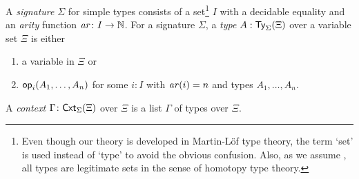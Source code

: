 \begin{definition} \label{def:simple-signature}
  A \emph{signature} $\Sigma$ for simple types consists of a set\footnote{%
    Even though our theory is developed in Martin-L\"of type theory, the term `set' is used instead of `type' to avoid the obvious confusion. 
    Also, as we assume \AxiomK, all types are legitimate sets in the sense of homotopy type theory.
  }
  $I$ with a decidable equality and an \emph{arity} function $\mathit{ar}\colon I \to \mathbb{N}$.
  For a signature $\Sigma$, a \emph{type} $A : \mathsf{Ty}_{\Sigma}(\Xi)$ over a variable set $\Xi$ is either
  \begin{enumerate}
    \item a variable in $\Xi$ or
    \item $\mathsf{op}_{i}(A_1, \ldots, A_n)$ for some $i:I$ with $\mathit{ar}(i) = n$ and types $A_1,\ldots, A_n$.
  \end{enumerate}
  A \emph{context} $\Gamma \colon \mathsf{Cxt}_{\Sigma}(\Xi)$ over $\Xi$ is a list $\Gamma$ of types over $\Xi$. 
\end{definition}

